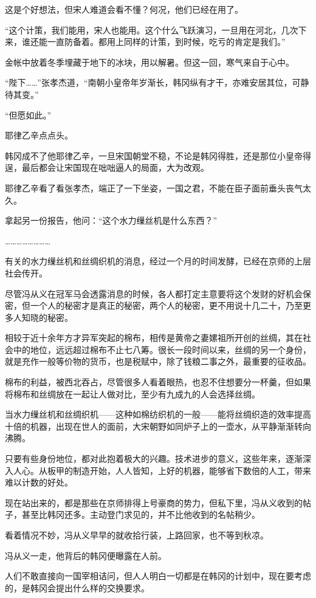 这是个好想法，但宋人难道会看不懂？何况，他们已经在用了。

“这个计策，我们能用，宋人也能用。这个什么飞跃演习，一旦用在河北，几次下来，谁还能一直防备着。都用上同样的计策，到时候，吃亏的肯定是我们。”

金帐中放着冬季埋藏于地下的冰块，用以解暑。但这一回，寒气来自于心中。

“陛下……”张孝杰道，“南朝小皇帝年岁渐长，韩冈纵有才干，亦难安居其位，可静待其变。”

“但愿如此。”

耶律乙辛点点头。

韩冈成不了他耶律乙辛，一旦宋国朝堂不稳，不论是韩冈得胜，还是那位小皇帝得逞，最后都会让宋国现在咄咄逼人的局面，大为改观。

耶律乙辛看了看张孝杰，端正了一下坐姿，一国之君，不能在臣子面前垂头丧气太久。

拿起另一份报告，他问：“这个水力缫丝机是什么东西？”

……………………

有关的水力缫丝机和丝绸织机的消息，经过一个月的时间发酵，已经在京师的上层社会传开。

尽管冯从义在冠军马会透露消息的时候，各人都打定主意要将这个发财的好机会保密，但一个人的秘密才是真正的秘密，两个人的秘密，更不用说十几二十，乃至更多人知晓的秘密。

相较于近十余年方才异军突起的棉布，相传是黄帝之妻嫘祖所开创的丝绸，其在社会中的地位，远远超过棉布不止七八筹。很长一段时间以来，丝绸的另一个身份，就是充作一般等价物的货币，也是税赋中，除了钱粮二事之外，最重要的征收品。

棉布的利益，被西北吞占，尽管很多人看着眼热，也忍不住想要分一杯羹，但如果将棉布和丝绸放在一起让人做对比，至少有九成九的人会选择丝绸。

当水力缫丝机和丝绸织机——这种如棉纺织机的一般——能将丝绸织造的效率提高十倍的机器，出现在世人的面前，大宋朝野如同炉子上的一壶水，从平静渐渐转向沸腾。

只要有些身份地位，都对此抱着极大的兴趣。技术进步的意义，这些年来，逐渐深入人心。从板甲的制造开始，人人皆知，上好的机器，能够省下数倍的人工，带来难以计数的好处。

现在站出来的，都是那些在京师排得上号豪商的势力，但私下里，冯从义收到的帖子，甚至比韩冈还多。主动登门求见的，并不比他收到的名帖稍少。

看着情况不妙，冯从义早早的就收拾行装，上路回家，也不等到秋凉。

冯从义一走，他背后的韩冈便曝露在人前。

人们不敢直接向一国宰相诘问，但人人明白一切都是在韩冈的计划中，现在要考虑的，是韩冈会提出什么样的交换要求。

